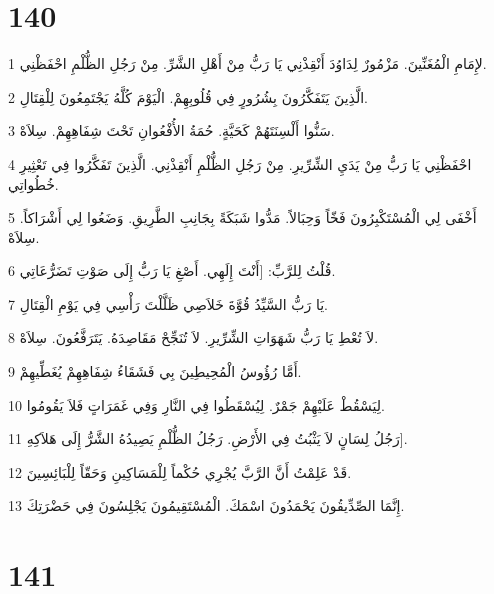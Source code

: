 \chapter{140}

\par 1 لإِمَامِ الْمُغَنِّينَ. مَزْمُورٌ لِدَاوُدَ أَنْقِذْنِي يَا رَبُّ مِنْ أَهْلِ الشَّرِّ. مِنْ رَجُلِ الظُّلْمِ احْفَظْنِي.
\par 2 الَّذِينَ يَتَفَكَّرُونَ بِشُرُورٍ فِي قُلُوبِهِمْ. الْيَوْمَ كُلَّهُ يَجْتَمِعُونَ لِلْقِتَالِ.
\par 3 سَنُّوا أَلْسِنَتَهُمْ كَحَيَّةٍ. حُمَةُ الأُفْعُوانِ تَحْتَ شِفَاهِهِمْ. سِلاَهْ.
\par 4 احْفَظْنِي يَا رَبُّ مِنْ يَدَيِ الشِّرِّيرِ. مِنْ رَجُلِ الظُّلْمِ أَنْقِذْنِي. الَّذِينَ تَفَكَّرُوا فِي تَعْثِيرِ خُطُواتِي.
\par 5 أَخْفَى لِي الْمُسْتَكْبِرُونَ فَخّاً وَحِبَالاً. مَدُّوا شَبَكَةً بِجَانِبِ الطَّرِيقِ. وَضَعُوا لِي أَشْرَاكاً. سِلاَهْ.
\par 6 قُلْتُ لِلرَّبِّ: [أَنْتَ إِلَهِي. أَصْغِ يَا رَبُّ إِلَى صَوْتِ تَضَرُّعَاتِي.
\par 7 يَا رَبُّ السَّيِّدُ قُوَّةَ خَلاَصِي ظَلَّلْتَ رَأْسِي فِي يَوْمِ الْقِتَالِ.
\par 8 لاَ تُعْطِ يَا رَبُّ شَهَوَاتِ الشِّرِّيرِ. لاَ تُنَجِّحْ مَقَاصِدَهُ. يَتَرَفَّعُونَ. سِلاَهْ.
\par 9 أَمَّا رُؤُوسُ الْمُحِيطِينَ بِي فَشَقَاءُ شِفَاهِهِمْ يُغَطِّيهِمْ.
\par 10 لِيَسْقُطْ عَلَيْهِمْ جَمْرٌ. لِيُسْقَطُوا فِي النَّارِ وَفِي غَمَرَاتٍ فَلاَ يَقُومُوا.
\par 11 رَجُلُ لِسَانٍ لاَ يَثْبُتُ فِي الأَرْضِ. رَجُلُ الظُّلْمِ يَصِيدُهُ الشَّرُّ إِلَى هَلاَكِهِ].
\par 12 قَدْ عَلِمْتُ أَنَّ الرَّبَّ يُجْرِي حُكْماً لِلْمَسَاكِينِ وَحَقّاً لِلْبَائِسِينَ.
\par 13 إِنَّمَا الصِّدِّيقُونَ يَحْمَدُونَ اسْمَكَ. الْمُسْتَقِيمُونَ يَجْلِسُونَ فِي حَضْرَتِكَ.

\chapter{141}

